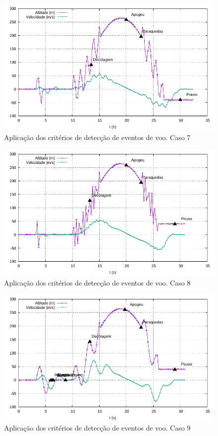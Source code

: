 \documentclass[12pt,a4paper]{article}
\begin{document}
\begin{figure}[!ht]
	\centering
	\includegraphics[width=\textwidth]{./data/cases/case07/trajectory}
	\caption{Aplicação dos critérios de detecção de eventos de voo. Caso 7}
	\label{fig:case07}
\end{figure}
\begin{figure}[!ht]
	\centering
	\includegraphics[width=\textwidth]{./data/cases/case08/trajectory}
	\caption{Aplicação dos critérios de detecção de eventos de voo. Caso 8}
	\label{fig:case08}
\end{figure}
\begin{figure}[!ht]
	\includegraphics[width=\textwidth]{./data/cases/case09/trajectory}
	\caption{Aplicação dos critérios de detecção de eventos de voo. Caso 9}
	\label{fig:case09}
\end{figure}
\end{document}
